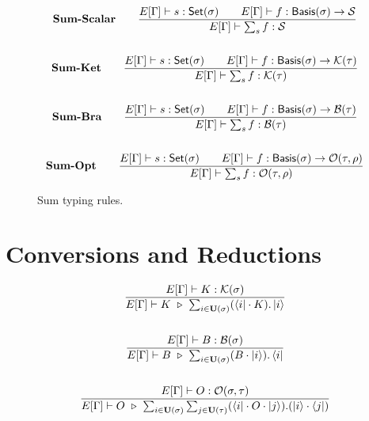 \documentclass{article}
\begin{document}
\begin{figure}[h]
    \begin{gather*}
        \textbf{Sum-Scalar} \qquad
        \frac{E[\Gamma] \vdash s : \mathsf{Set}(\sigma) \qquad E[\Gamma] \vdash f : \mathsf{Basis}(\sigma) \to \mathcal{S}}{E[\Gamma] \vdash \sum_{s} f : \mathcal{S}} \\
        \\
        \textbf{Sum-Ket} \qquad
        \frac{E[\Gamma] \vdash s : \mathsf{Set}(\sigma) \qquad E[\Gamma] \vdash f : \mathsf{Basis}(\sigma) \to \mathcal{K}(\tau)}{E[\Gamma] \vdash \sum_{s} f : \mathcal{K}(\tau)} \\
        \\
        \textbf{Sum-Bra} \qquad
        \frac{E[\Gamma] \vdash s : \mathsf{Set}(\sigma) \qquad E[\Gamma] \vdash f : \mathsf{Basis}(\sigma) \to \mathcal{B}(\tau)}{E[\Gamma] \vdash \sum_{s} f : \mathcal{B}(\tau)} \\
        \\
        \textbf{Sum-Opt} \qquad
        \frac{E[\Gamma] \vdash s : \mathsf{Set}(\sigma) \qquad E[\Gamma] \vdash f : \mathsf{Basis}(\sigma) \to \mathcal{O}(\tau, \rho)}{E[\Gamma] \vdash \sum_{s} f : \mathcal{O}(\tau, \rho)}
    \end{gather*}
    \caption{Sum typing rules.}
\end{figure}

\clearpage
\section{Conversions and Reductions}

\begin{figure}[h]
    \begin{gather*}
        \frac{E[\Gamma] \vdash K : \KType(\sigma)}{E[\Gamma] \vdash K \ \reduce\ \sum_{i \in \mathbf{U}(\sigma)}(\bra{i}\cdot K).\ket{i}} \\
        \\
        \frac{E[\Gamma] \vdash B : \BType(\sigma)}{E[\Gamma] \vdash B \ \reduce\ \sum_{i \in \mathbf{U}(\sigma)}(B \cdot \ket{i}).\bra{i}} \\
        \\
        \frac{E[\Gamma] \vdash O : \OType(\sigma, \tau)}{E[\Gamma] \vdash O \ \reduce\ \sum_{i \in \mathbf{U}(\sigma)} \sum_{j \in \mathbf{U}(\tau)}(\bra{i} \cdot O \cdot \ket{j}).(\ket{i} \cdot \bra{j})}
    \end{gather*}
\end{figure}
\end{document}
